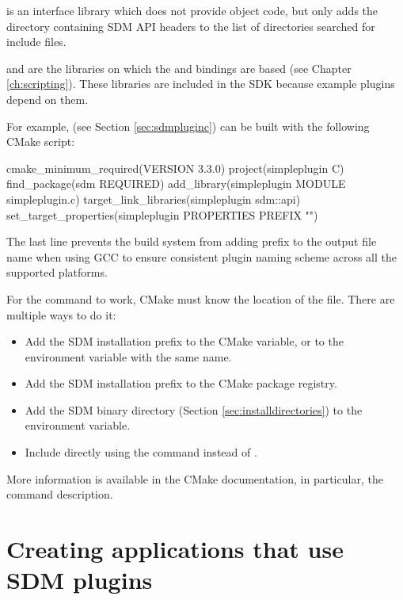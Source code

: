 \documentclass[a4paper,12pt,twoside,extrafontsizes]{memoir}
\begin{document}
 is an interface library which does not provide object code, but only adds the directory containing SDM API headers to the list of directories searched for include files.

 and  are the \cplusplus{} libraries on which the  and  bindings are based (see Chapter \ref{ch:scripting}). These libraries are included in the SDK because example plugins depend on them.

For example,  (see Section \ref{sec:sdmpluginc}) can be built with the following CMake script:

\begin{shellcmds}
cmake\_minimum\_required(VERSION 3.3.0)
project(simpleplugin C)
find\_package(sdm REQUIRED)
add\_library(simpleplugin MODULE simpleplugin.c)
target\_link\_libraries(simpleplugin sdm::api)
set\_target\_properties(simpleplugin PROPERTIES PREFIX "")
\end{shellcmds}

The last line prevents the build system from adding  prefix to the output file name when using GCC to ensure consistent plugin naming scheme across all the supported platforms.

For the  command to work, CMake must know the location of the  file. There are multiple ways to do it:

\begin{itemize}
	\item Add the SDM installation prefix to the  CMake variable, or to the environment variable with the same name.
	\item Add the SDM installation prefix to the CMake package registry.
	\item Add the SDM binary directory (Section \ref{sec:installdirectories}) to the  environment variable.
	\item Include  directly using the  command instead of .
\end{itemize}

More information is available in the CMake documentation, in particular, the  command description.

\chapter{Creating applications that use SDM plugins}
\end{document}

